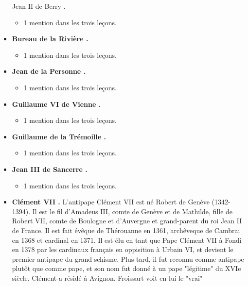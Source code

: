\documentclass[12pt, a4paper]{article}
\begin{document}
\begin{itemize}
{{              Jean
              II
              de
              Berry
            .}  \begin{itemize} \item{1 mention dans les trois leçons.}  \end{itemize}}  \item{\textbf{
              Bureau
              de la
              Rivière
            .}  \begin{itemize} \item{1 mention dans les trois leçons.}  \end{itemize}}  \item{\textbf{
              Jean
              de la
              Personne
            .}  \begin{itemize} \item{1 mention dans les trois leçons.}  \end{itemize}}  \item{\textbf{
              Guillaume
              VI
              de
              Vienne
            .}  \begin{itemize} \item{1 mention dans les trois leçons.}  \end{itemize}}  \item{\textbf{
              Guillaume
              de la
              Trémoille
            .}  \begin{itemize} \item{1 mention dans les trois leçons.}  \end{itemize}}  \item{\textbf{
              Jean
              III
              de
              Sancerre
            .}  \begin{itemize} \item{1 mention dans les trois leçons.}  \end{itemize}}  \item{\textbf{
              Clément
              VII
            .} L'antipape Clément VII est né Robert de Genève (1342-1394). Il est le fil d'Amadeus III, comte de Genève et de Mathilde, fille
              de Robert VII, comte de Boulogne et d'Auvergne et grand-parent du roi Jean II de France. Il est fait évêque de Thérouanne en 1361, archêveque de Cambrai en 1368 et
              cardinal en 1371. Il est élu en tant que Pape Clément VII à Fondi en 1378 par les cardinaux français en oppisition à Urbain VI, et devient le premier antipape du grand schisme.
              Plus tard, il fut reconnu comme antipape plutôt que comme pape, et son nom fut donné à un pape "légitime" du XVIe siècle. Clément a résidé à Avignon. Froissart voit en lui le "vrai"
}
\end{itemize}
\end{document}
